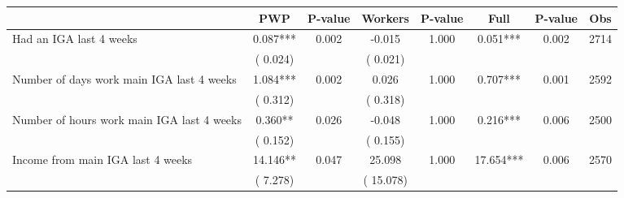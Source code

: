 
\begin{tabular}{l*{7}{c}}\hline&\multicolumn{1}{c}{PWP}&\multicolumn{1}{c}{P-value}&\multicolumn{1}{c}{Workers}&\multicolumn{1}{c}{P-value}&\multicolumn{1}{c}{Full}&\multicolumn{1}{c}{P-value}&\multicolumn{1}{c}{Obs} \\ \hline

 Had an IGA last 4 weeks       &              0.087***       &        0.002  &             -0.015       &        1.000  &              0.051***       &              0.002 &  2714 \\ 
                       &       (       0.024)             &                               &       (       0.021)                     &                               &                                               &                                &                      \\ 

 Number of days work main IGA last 4 weeks       &              1.084***       &        0.002  &              0.026       &        1.000  &              0.707***       &              0.001 &  2592 \\ 
                       &       (       0.312)             &                               &       (       0.318)                     &                               &                                               &                                &                      \\ 

 Number of hours work main IGA last 4 weeks       &              0.360**       &        0.026  &             -0.048       &        1.000  &              0.216***       &              0.006 &  2500 \\ 
                       &       (       0.152)             &                               &       (       0.155)                     &                               &                                               &                                &                      \\ 

 Income from main IGA last 4 weeks       &             14.146**       &        0.047  &             25.098       &        1.000  &             17.654***       &              0.006 &  2570 \\ 
                       &       (       7.278)             &                               &       (      15.078)                     &                               &                                               &                                &                      \\ 


\end{tabular}
